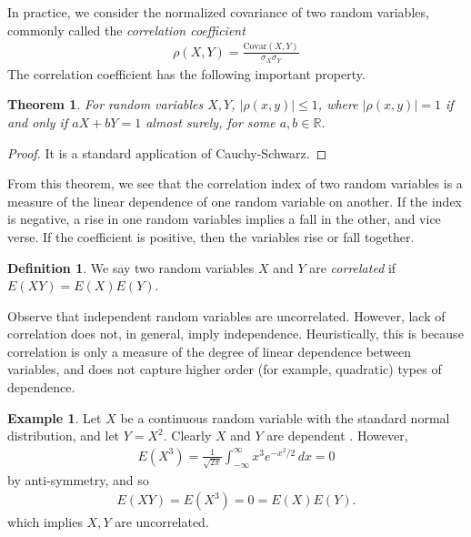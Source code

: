 \documentclass[12pt]{article}
\newcommand{\rr}{\mathbb{R}}
\newcommand{\covar}{\text{Covar}}
\theoremstyle{plain}
\newtheorem{theorem}{Theorem}
\theoremstyle{definition}
\newtheorem*{definition}{Definition}
\newtheorem*{example}{Example}
\theoremstyle{remark}
\numberwithin{equation}{section}  %
\begin{document}
In practice, we consider the normalized covariance of two random variables,
commonly called the \emph{correlation coefficient}
\begin{align*}
\rho(X,Y) = \frac{\covar(X,Y)}{\sigma_X \sigma_Y}
\end{align*}
The correlation coefficient has the following important property.
\begin{theorem}
For random variables $X, Y$, $|\rho(x,y)| \le 1$, where $|\rho(x,y)| = 1$ if and
only if $aX + bY = 1$ almost surely, for some $a,b \in \rr$. 
\end{theorem}
\begin{proof}
It is a standard application of Cauchy-Schwarz.
\end{proof}
From this theorem, we see that the correlation index of two random variables is
a measure of the linear dependence of one random variable on another. If the
index is negative, a rise in one random variables implies a fall in the other,
and vice verse. If the coefficient is positive, then the variables rise or fall
together.
\begin{definition}
We say two random variables $X$ and $Y$ are \emph{correlated} 
if $E(XY) = E(X)E(Y)$.
\end{definition}
Observe that independent random variables are uncorrelated. However,
lack of correlation does not, in general, imply independence. Heuristically, this is
because correlation is only a measure of the degree of linear dependence
between variables, and does not capture higher order (for example, quadratic)
types of dependence. 
\begin{example}
Let $X$ be a continuous random variable with the standard normal distribution,
and let $Y = X^2$. Clearly $X$ and $Y$ are dependent . However,
\begin{align*}
E(X^3) = \frac{1}{\sqrt{2 \pi}}\int_{-\infty}^{\infty} x^3 e^{-x^2/2} \, dx = 0
\end{align*}
by anti-symmetry, and so
\begin{align*}
E(XY) = E(X^3) = 0 = E(X) E(Y).
\end{align*}
which implies $X, Y$ are uncorrelated.
\end{example}
\end{document}
